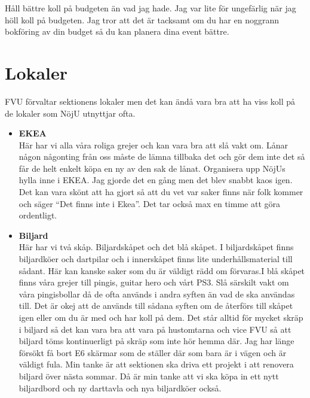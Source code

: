 \documentclass[10pt]{article}
\begin{document}
    Håll bättre koll på budgeten än vad jag hade. Jag var lite för ungefärlig när jag höll koll på budgeten. Jag tror att det är tacksamt om du har en noggrann bokföring av din budget så du kan planera dina event bättre.

    \section{Lokaler}
    FVU förvaltar sektionens lokaler men det kan ändå vara bra att ha viss koll på de lokaler som NöjU utnyttjar ofta.
    \begin{itemize}
        \item \textbf{EKEA} \\
        Här har vi alla våra roliga grejer och kan vara bra att slå vakt om. Lånar någon någonting från oss måste de lämna tillbaka det och gör dem inte det så får de helt enkelt köpa en ny av den sak de lånat. Organisera upp NöjUs hylla inne i EKEA. Jag gjorde det en gång men det blev snabbt kaos igen. Det kan vara skönt att ha gjort så att du vet var saker finns när folk kommer och säger ``Det finns inte i Ekea''. Det tar också max en timme att göra ordentligt.
        \item \textbf{Biljard} \\
        Här har vi två skåp. Biljardskåpet och det blå skåpet. I biljardskåpet finns biljardköer och dartpilar och i innerskåpet finns lite underhållsmaterial till sådant. Här kan kanske saker som du är väldigt rädd om förvaras.I blå skåpet finns våra grejer till pingis, guitar hero och vårt PS3. Slå särskilt vakt om våra pingisbollar då de ofta används i andra syften än vad de ska användas till. Det är okej att de används till sådana syften om de återförs till skåpet igen eller om du är med och har koll på dem. Det står alltid för mycket skräp i biljard så det kan vara bra att vara på hustomtarna och vice FVU så att biljard töms kontinuerligt på skräp som inte hör hemma där. Jag har länge försökt få bort E6 skärmar som de ställer där som bara är i vägen och är väldigt fula. Min tanke är att sektionen ska driva ett projekt i att renovera biljard över nästa sommar. Då är min tanke att vi ska köpa in ett nytt biljardbord och ny darttavla och nya biljardköer också.
    \end{itemize}
\end{document}
